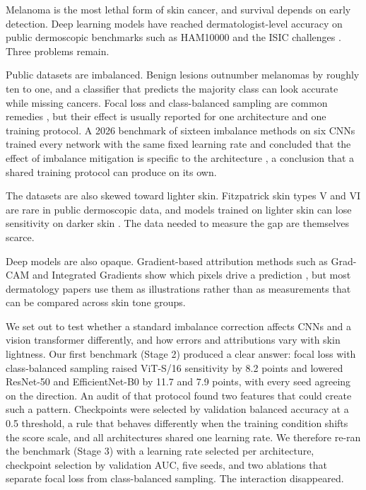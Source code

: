 \documentclass[11pt]{article}
\begin{document}
Melanoma is the most lethal form of skin cancer, and survival depends on early detection. Deep learning models have reached dermatologist-level accuracy on public dermoscopic benchmarks such as HAM10000 and the ISIC challenges \citep{tschandl2018ham10000,codella2018isic}. Three problems remain.

Public datasets are imbalanced. Benign lesions outnumber melanomas by roughly ten to one, and a classifier that predicts the majority class can look accurate while missing cancers. Focal loss and class-balanced sampling are common remedies \citep{lin2017focal}, but their effect is usually reported for one architecture and one training protocol. A 2026 benchmark of sixteen imbalance methods on six CNNs trained every network with the same fixed learning rate and concluded that the effect of imbalance mitigation is specific to the architecture \citep{ahmad2026imbalance}, a conclusion that a shared training protocol can produce on its own.

The datasets are also skewed toward lighter skin. Fitzpatrick skin types V and VI are rare in public dermoscopic data, and models trained on lighter skin can lose sensitivity on darker skin \citep{groh2021fitzpatrick17k,daneshjou2022ddi,ruga2026pipsqueak}. The data needed to measure the gap are themselves scarce.

Deep models are also opaque. Gradient-based attribution methods such as Grad-CAM and Integrated Gradients show which pixels drive a prediction \citep{selvaraju2017gradcam,sundararajan2017ig}, but most dermatology papers use them as illustrations rather than as measurements that can be compared across skin tone groups.

We set out to test whether a standard imbalance correction affects CNNs and a vision transformer differently, and how errors and attributions vary with skin lightness. Our first benchmark (Stage 2) produced a clear answer: focal loss with class-balanced sampling raised ViT-S/16 sensitivity by 8.2 points and lowered ResNet-50 and EfficientNet-B0 by 11.7 and 7.9 points, with every seed agreeing on the direction. An audit of that protocol found two features that could create such a pattern. Checkpoints were selected by validation balanced accuracy at a 0.5 threshold, a rule that behaves differently when the training condition shifts the score scale, and all architectures shared one learning rate. We therefore re-ran the benchmark (Stage 3) with a learning rate selected per architecture, checkpoint selection by validation AUC, five seeds, and two ablations that separate focal loss from class-balanced sampling. The interaction disappeared.
\end{document}
